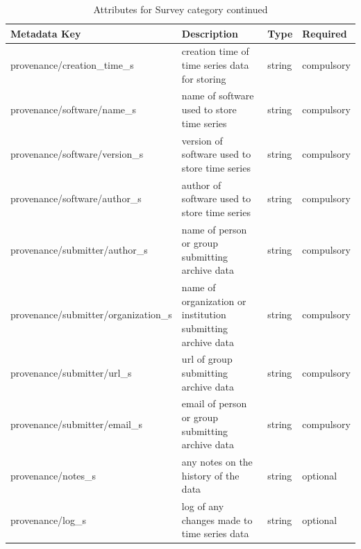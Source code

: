 \documentclass{article}
\begin{document}
\newpage
\begin{table}[htb!]
	\caption[Attributes for Survey]{Attributes for Survey category continued}
	\begin{tabular}{|l|p{3in}|l|l|}
		\hline
		\textbf{Metadata Key} & \textbf{Description} & \textbf{Type} & \textbf{Required} \\ \hline	
		provenance/creation\_time\_s & creation time of time series data for storing & string & compulsory \\ \hline
		provenance/software/name\_s & name of software used to store time series & string & compulsory \\ \hline
		provenance/software/version\_s & version of software used to store time series & string & compulsory \\ \hline
		provenance/software/author\_s & author of software used to store time series & string & compulsory \\ \hline
		provenance/submitter/author\_s & name of person or group submitting archive data & string & compulsory \\ \hline
		provenance/submitter/organization\_s & name of organization or institution submitting archive data & string & compulsory \\ \hline
		provenance/submitter/url\_s & url of group submitting archive data & string & compulsory \\ \hline
		provenance/submitter/email\_s & email of person or group submitting archive data & string & compulsory  \\ \hline
		provenance/notes\_s & any notes on the history of the data & string & optional \\ \hline
		provenance/log\_s & log of any changes made to time series data & string & optional \\ \hline
	\end{tabular}
	\label{tab:station02}
\end{table}
   
\end{document}
